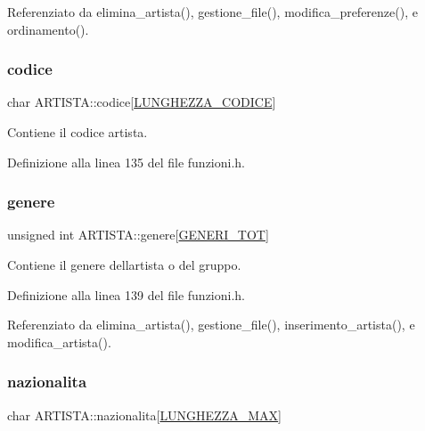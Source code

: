Referenziato da elimina\+\_\+artista(), gestione\+\_\+file(), modifica\+\_\+preferenze(), e ordinamento().

\mbox{\label{struct_a_r_t_i_s_t_a_a614effe8a3285fd1b6bd29e7bff7ff72}} 
\subsubsection{\texorpdfstring{codice}{codice}}
{\footnotesize\ttfamily char A\+R\+T\+I\+S\+T\+A\+::codice\mbox{[}\mbox{\hyperlink{funzioni_8h_a15beac41f998f4495a79396160235665}{L\+U\+N\+G\+H\+E\+Z\+Z\+A\+\_\+\+C\+O\+D\+I\+CE}}\mbox{]}}

Contiene il codice artista. 

Definizione alla linea 135 del file funzioni.\+h.

\mbox{\label{struct_a_r_t_i_s_t_a_a27c2d0af7e1f8ac38c84bcfc71f87f4b}} 
\subsubsection{\texorpdfstring{genere}{genere}}
{\footnotesize\ttfamily unsigned int A\+R\+T\+I\+S\+T\+A\+::genere\mbox{[}\mbox{\hyperlink{funzioni_8h_aadfbb01ff59a52b086b4c96f1a5e0cd2}{G\+E\+N\+E\+R\+I\+\_\+\+T\+OT}}\mbox{]}}

Contiene il genere dell\textquotesingle{}artista o del gruppo. 

Definizione alla linea 139 del file funzioni.\+h.



Referenziato da elimina\+\_\+artista(), gestione\+\_\+file(), inserimento\+\_\+artista(), e modifica\+\_\+artista().

\mbox{\label{struct_a_r_t_i_s_t_a_a9b2d858c8f1c17c58a15ad20eb10118e}} 
\subsubsection{\texorpdfstring{nazionalita}{nazionalita}}
{\footnotesize\ttfamily char A\+R\+T\+I\+S\+T\+A\+::nazionalita\mbox{[}\mbox{\hyperlink{funzioni_8h_a2cdd71b92d6e869f8b094e32a6da6a62}{L\+U\+N\+G\+H\+E\+Z\+Z\+A\+\_\+\+M\+AX}}\mbox{]}}

